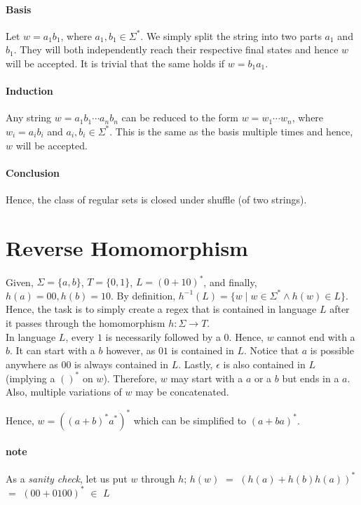 \documentclass[11pt,letterpaper]{article}
\begin{document}
\paragraph{Basis} Let $w = a_1b_1$, where $a_1,b_1 \in \Sigma^*$. We simply split the string into two parts $a_1$ and $b_1$. They will both independently reach their respective final states and hence $w$ will be accepted. It is trivial that the same holds if $w = b_1a_1$.
\paragraph{Induction} Any string $w = a_1b_1 \cdots a_nb_n$ can be reduced to the form $w = w_1 \cdots w_n$, where $w_i = a_ib_i$ and $a_i,b_i \in \Sigma^*$. This is the same as the basis multiple times and hence, $w$ will be accepted.
\paragraph{Conclusion} Hence, the class of regular sets is closed under shuffle (of two strings).
\pagebreak

\section{Reverse Homomorphism}
Given, $\Sigma = \{a,b\}$, $T = \{0,1\}$, $L = (0+10)^*$, and finally, $h(a)=00, h(b)=10$. By definition, $h^{-1}(L) = \{w \mid w \in \Sigma^* \wedge h(w) \in L\}$. Hence, the task is to simply create a regex that is contained in language $L$ after it passes through the homomorphism $h: \Sigma \to T$. \\
In language $L$, every $1$ is necessarily followed by a $0$. Hence, $w$ cannot end with a $b$. It can start with a $b$ however, as $01$ is contained in $L$. Notice that $a$ is possible anywhere as $00$ is always contained in $L$. Lastly, $\epsilon$ is also contained in $L$ (implying a $()^*$ on $w$). Therefore, $w$ may start with a $a$ or a $b$ but ends in a $a$. Also, multiple variations of $w$ may be concatenated.
\begin{center}
    Hence, $w = ((a+b)^*a^*)^*$ which can be simplified to $(a+ba)^*$.
\end{center}
\paragraph{note}
As a \textit{sanity check}, let us put $w$ through $h$;
$h(w)$ $=$ $(h(a)+h(b)h(a))^*$ $=$ $(00+0100)^*$ $\in$ $L$
\end{document}
